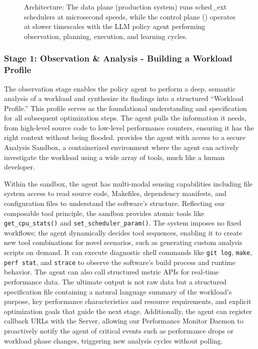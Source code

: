 \begin{figure}[h]
\centering
{}
\caption{\sys Architecture: The data plane (production system) runs sched\_ext schedulers at microsecond speeds, while the control plane (\sys) operates at slower timescales with the LLM policy agent performing observation, planning, execution, and learning cycles.}
\label{fig:architecture}
\end{figure}


\subsubsection{Stage 1: Observation \& Analysis - Building a Workload Profile}

The observation stage enables the policy agent to perform a deep, semantic analysis of a workload and synthesize its findings into a structured ``Workload Profile.'' This profile serves as the foundational understanding and specification for all subsequent optimization steps. The agent pulls the information it needs, from high-level source code to low-level performance counters, ensuring it has the right context without being flooded. \sys provides the agent with access to a secure Analysis Sandbox, a containerized environment where the agent can actively investigate the workload using a wide array of tools, much like a human developer.

Within the sandbox, the agent has multi-modal sensing capabilities including file system access to read source code, Makefiles, dependency manifests, and configuration files to understand the software's structure. Reflecting our composable tool principle, the sandbox provides atomic tools like \texttt{get\_cpu\_stats()} and \texttt{set\_scheduler\_param()}. The system imposes no fixed workflows; the agent dynamically decides tool sequences, enabling it to create new tool combinations for novel scenarios, such as generating custom analysis scripts on demand. It can execute diagnostic shell commands like \texttt{git log}, \texttt{make}, \texttt{perf stat}, and \texttt{strace} to observe the software's build process and runtime behavior. The agent can also call structured metric APIs for real-time performance data. The ultimate output is not raw data but a structured specification file containing a natural language summary of the workload's purpose, key performance characteristics and resource requirements, and explicit optimization goals that guide the next stage. Additionally, the agent can register callback URLs with the \sys Server, allowing our Performance Monitor Daemon to proactively notify the agent of critical events such as performance drops or workload phase changes, triggering new analysis cycles without polling.

